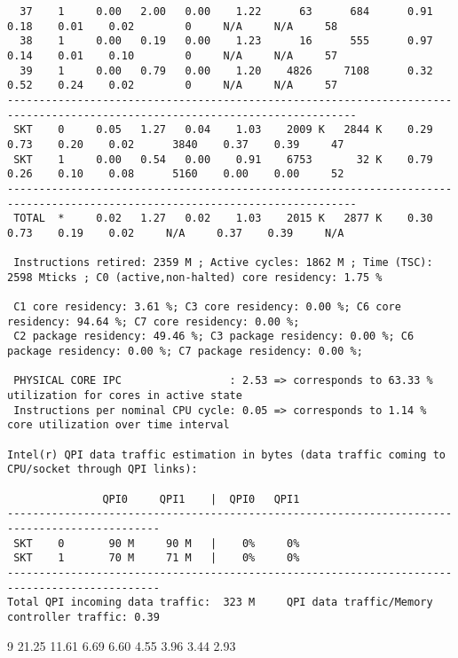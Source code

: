\begin{lstlisting}
  37    1     0.00   2.00   0.00    1.22      63      684      0.91    0.18    0.01    0.02        0     N/A     N/A     58
  38    1     0.00   0.19   0.00    1.23      16      555      0.97    0.14    0.01    0.10        0     N/A     N/A     57
  39    1     0.00   0.79   0.00    1.20    4826     7108      0.32    0.52    0.24    0.02        0     N/A     N/A     57
-----------------------------------------------------------------------------------------------------------------------------
 SKT    0     0.05   1.27   0.04    1.03    2009 K   2844 K    0.29    0.73    0.20    0.02      3840    0.37    0.39     47
 SKT    1     0.00   0.54   0.00    0.91    6753       32 K    0.79    0.26    0.10    0.08      5160    0.00    0.00     52
-----------------------------------------------------------------------------------------------------------------------------
 TOTAL  *     0.02   1.27   0.02    1.03    2015 K   2877 K    0.30    0.73    0.19    0.02     N/A     0.37    0.39     N/A

 Instructions retired: 2359 M ; Active cycles: 1862 M ; Time (TSC): 2598 Mticks ; C0 (active,non-halted) core residency: 1.75 %

 C1 core residency: 3.61 %; C3 core residency: 0.00 %; C6 core residency: 94.64 %; C7 core residency: 0.00 %;
 C2 package residency: 49.46 %; C3 package residency: 0.00 %; C6 package residency: 0.00 %; C7 package residency: 0.00 %;

 PHYSICAL CORE IPC                 : 2.53 => corresponds to 63.33 % utilization for cores in active state
 Instructions per nominal CPU cycle: 0.05 => corresponds to 1.14 % core utilization over time interval

Intel(r) QPI data traffic estimation in bytes (data traffic coming to CPU/socket through QPI links):

               QPI0     QPI1    |  QPI0   QPI1  
----------------------------------------------------------------------------------------------
 SKT    0       90 M     90 M   |    0%     0%   
 SKT    1       70 M     71 M   |    0%     0%   
----------------------------------------------------------------------------------------------
Total QPI incoming data traffic:  323 M     QPI data traffic/Memory controller traffic: 0.39
\end{lstlisting}

9
 21.25%
  11.61%
   6.69%
   6.60%
   4.55%
   3.96%
   3.44%
   2.93%


